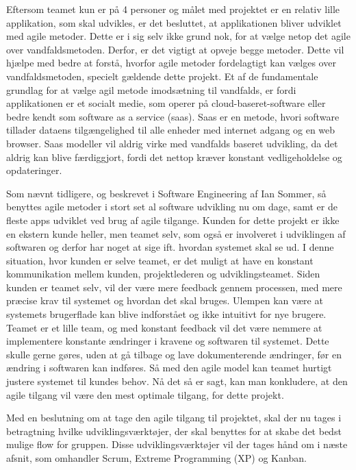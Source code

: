 Eftersom teamet kun er på 4 personer og målet med projektet er en relativ lille applikation, som skal udvikles, er det besluttet, at applikationen bliver udviklet med agile metoder. Dette er i sig selv ikke grund nok, for at vælge netop det agile over vandfaldsmetoden. Derfor, er det vigtigt at opveje begge metoder. Dette vil hjælpe med bedre at forstå, hvorfor agile metoder fordelagtigt kan vælges over vandfaldsmetoden, specielt gældende dette projekt. Et af de fundamentale grundlag for at vælge agil metode imodsætning til vandfalds, er fordi applikationen er et socialt medie, som operer på cloud-baseret-software eller bedre kendt som software as a service (saas). Saas er en metode, hvori software tillader dataens tilgængelighed til alle enheder med internet adgang og en web browser.\cite{Sommerville} Saas modeller vil aldrig virke med vandfalds baseret udvikling, da det aldrig kan blive færdiggjort, fordi det nettop kræver konstant vedligeholdelse og opdateringer.

Som nævnt tidligere, og beskrevet i Software Engineering af Ian Sommer, så benyttes agile metoder i stort set al software udvikling nu om dage, samt er de fleste apps udviklet ved brug af agile tilgange\cite{Sommerville}.  Kunden for dette projekt er ikke en ekstern kunde heller, men teamet selv, som også er involveret i udviklingen af softwaren og derfor har noget at sige ift. hvordan systemet skal se ud. I denne situation, hvor kunden er selve teamet, er det muligt at have en konstant kommunikation mellem kunden, projektlederen og udviklingsteamet. Siden kunden er teamet selv, vil der være mere feedback gennem processen, med mere præcise krav til systemet og hvordan det skal bruges. Ulempen kan være at systemets brugerflade kan blive indforstået og ikke intuitivt for nye brugere. Teamet er et lille team, og med konstant feedback vil det være nemmere at implementere konstante ændringer i kravene og softwaren til systemet. Dette skulle gerne gøres, uden at gå tilbage og lave dokumenterende ændringer, før en ændring i softwaren kan indføres. Så med den agile model kan teamet hurtigt justere systemet til kundes behov. Nå det så er sagt, kan man konkludere, at den agile tilgang vil være den mest optimale tilgang, for dette projekt.

Med en beslutning om at tage den agile tilgang til projektet, skal der nu tages i betragtning hvilke udviklingsværktøjer, der skal benyttes for at skabe det bedst mulige flow for gruppen. Disse udviklingsværktøjer vil der tages hånd om i næste afsnit, som omhandler Scrum, Extreme Programming (XP) og Kanban.

